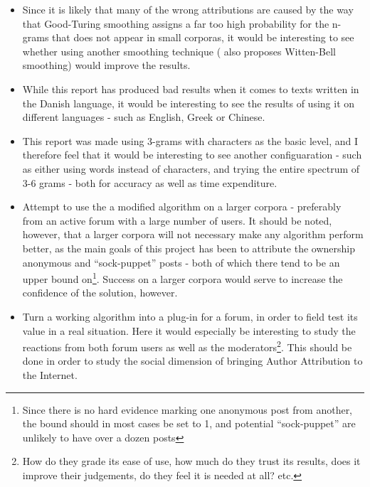 \begin{itemize}
\item Since it is likely that many of the wrong attributions are caused by the way that Good-Turing smoothing assigns a far too high probability for the n-grams that does not appear in small corporas, it would be interesting to see whether using another smoothing technique (\cite{nr4} also proposes Witten-Bell smoothing) would improve the results.

\item While this report has produced bad results when it comes to texts written in the Danish language, it would be interesting to see the results of using it on different languages - such as English, Greek or Chinese.

\item This report was made using 3-grams with characters as the basic level, and I therefore feel that it would be interesting to see another configuaration - such as either using words instead of characters, and trying the entire spectrum of 3-6 grams - both for accuracy as well as time expenditure. 

\item Attempt to use the a modified algorithm on a larger corpora - preferably from an active forum with a large number of users. It should be noted, however, that a larger corpora will not necessary make any algorithm perform better, as the main goals of this project has been to attribute the ownership anonymous and ``sock-puppet'' posts - both of which there tend to be an upper bound on\footnote{Since there is no hard evidence marking one anonymous post from another, the bound should in most cases be set to 1, and potential ``sock-puppet'' are unlikely to have over a dozen posts}. Success on a larger corpora would serve to increase the confidence of the solution, however. 

\item Turn a working algorithm into a plug-in for a forum, in order to field test its value in a real situation. Here it would especially be interesting to study the reactions from both forum users as well as the moderators\footnote{How do they grade its ease of use, how much do they trust its results, does it improve their judgements, do they feel it is needed at all? etc.}. This should be done in order to study the social dimension of bringing Author Attribution to the Internet.
\end{itemize}  
